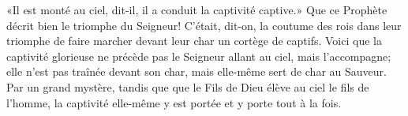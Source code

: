 «Il est monté au ciel, dit-il, il a conduit la captivité captive.»
Que ce Prophète décrit bien le triomphe du Seigneur!
	C’était, dit-on, la coutume des rois dans leur triomphe
	de faire marcher devant leur char un cortège de captifs.
Voici que la captivité glorieuse ne précède pas le Seigneur allant au ciel,
	mais l’accompagne;
	elle n’est pas traînée devant son char,
	mais elle-même sert de char au Sauveur.
Par un grand mystère,
	tandis que que le Fils de Dieu élève au ciel le fils de l’homme,
	la captivité elle-même y est portée et y porte tout à la fois.
